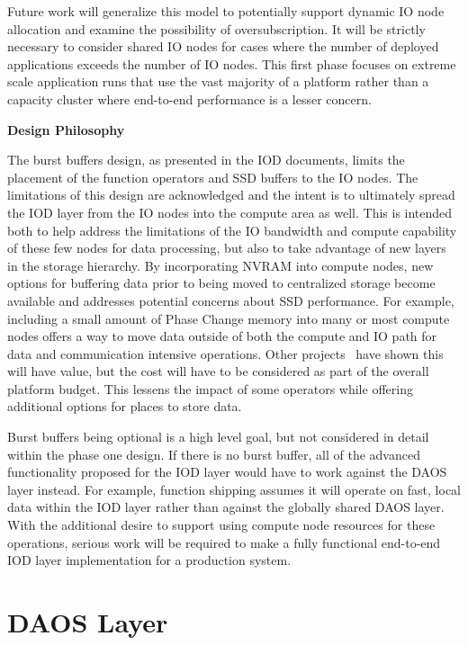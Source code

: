 \documentclass[conference]{IEEEtran}
\begin{document}
Future work will generalize this model to potentially support dynamic IO node
allocation and examine the possibility of oversubscription. It will be strictly
necessary to consider shared IO nodes for cases where the number of deployed
applications exceeds the number of IO nodes.  This first phase focuses on
extreme scale application runs that use the vast majority of a platform rather
than a capacity cluster where end-to-end performance is a lesser concern.

\noindent\textbf{Design Philosophy}

The burst buffers design, as presented in the IOD documents, limits the
placement of the function operators and SSD buffers to the IO nodes. The
limitations of this design are acknowledged and the intent is to ultimately
spread the IOD layer from the IO nodes into the compute area as well.  This is
intended both to help address the limitations of the IO bandwidth and compute
capability of these few nodes for data processing, but also to take advantage
of new layers in the storage hierarchy. By incorporating NVRAM into compute
nodes, new options for buffering data prior to being moved to centralized
storage become available and addresses potential concerns about SSD
performance. For example, including a small amount of Phase Change memory into
many or most compute nodes offers a way to move data outside of both the
compute and IO path for data and communication intensive operations. Other
projects~\cite{zheng:2010:predata} have shown this will have value, but the
cost will have to be considered as part of the overall platform budget. This
lessens the impact of some operators while offering additional options for
places to store data.

Burst buffers being optional is a high level goal, but not considered in detail
within the phase one design. If there is no burst buffer, all of the advanced
functionality proposed for the IOD layer would have to work against the DAOS
layer instead. For example, function shipping assumes it will operate on fast,
local data within the IOD layer rather than against the globally shared DAOS
layer. With the additional desire to support using compute node resources for
these operations, serious work will be required to make a fully functional
end-to-end IOD layer implementation for a production system.

\section{DAOS Layer}
\label{sec:daos}
\end{document}
